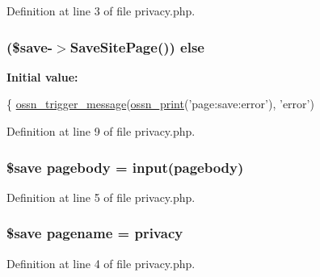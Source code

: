 Definition at line 3 of file privacy.\+php.

\subsubsection[{\texorpdfstring{else}{else}}]{ (\$save-\/$>$Save\+Site\+Page()) else}\hypertarget{components_2_ossn_site_pages_2actions_2edit_2privacy_8php_a3652d10f06e3bfc8edd1455fd0c357ae}{}\label{components_2_ossn_site_pages_2actions_2edit_2privacy_8php_a3652d10f06e3bfc8edd1455fd0c357ae}
{\bfseries Initial value\+:}
\begin{DoxyCode}
\{
    \hyperlink{ossn_8lib_8system_8php_ab3f23f23f32f50c12e7aea0ffaccaac7}{ossn\_trigger\_message}(\hyperlink{ossn_8lib_8languages_8php_a2be5d1c4b695593a9b9067b96df2150a}{ossn\_print}(\textcolor{stringliteral}{'page:save:error'}), \textcolor{stringliteral}{'error'})
\end{DoxyCode}


Definition at line 9 of file privacy.\+php.

\subsubsection[{\texorpdfstring{pagebody}{pagebody}}]{\setlength{\rightskip}{0pt plus 5cm}\$save pagebody = {\bf input}(\textquotesingle{}pagebody\textquotesingle{})}\hypertarget{components_2_ossn_site_pages_2actions_2edit_2privacy_8php_ac5e77655d4436fc87c23b803e772f55b}{}\label{components_2_ossn_site_pages_2actions_2edit_2privacy_8php_ac5e77655d4436fc87c23b803e772f55b}


Definition at line 5 of file privacy.\+php.

\subsubsection[{\texorpdfstring{pagename}{pagename}}]{\setlength{\rightskip}{0pt plus 5cm}\$save pagename = \textquotesingle{}privacy\textquotesingle{}}\hypertarget{components_2_ossn_site_pages_2actions_2edit_2privacy_8php_a80628cda62ee6fb56006a1a49ea33304}{}\label{components_2_ossn_site_pages_2actions_2edit_2privacy_8php_a80628cda62ee6fb56006a1a49ea33304}


Definition at line 4 of file privacy.\+php.

